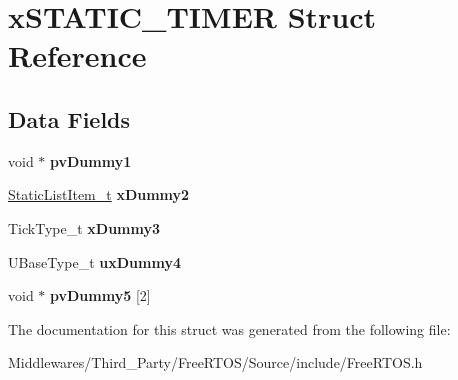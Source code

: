 \hypertarget{structx_s_t_a_t_i_c___t_i_m_e_r}{}\section{x\+S\+T\+A\+T\+I\+C\+\_\+\+T\+I\+M\+ER Struct Reference}
\label{structx_s_t_a_t_i_c___t_i_m_e_r}
\subsection*{Data Fields}
\begin{DoxyCompactItemize}
\item 
\mbox{\label{structx_s_t_a_t_i_c___t_i_m_e_r_a6d34686c479f85ca81b1c8b8d63de30f}} 
void $\ast$ {\bfseries pv\+Dummy1}
\item 
\mbox{\label{structx_s_t_a_t_i_c___t_i_m_e_r_af110422a11e634c23400ce5d10bd8b7f}} 
\mbox{\hyperlink{structx_s_t_a_t_i_c___l_i_s_t___i_t_e_m}{Static\+List\+Item\+\_\+t}} {\bfseries x\+Dummy2}
\item 
\mbox{\label{structx_s_t_a_t_i_c___t_i_m_e_r_ac1b972afc468f0e753a25442242e6137}} 
Tick\+Type\+\_\+t {\bfseries x\+Dummy3}
\item 
\mbox{\label{structx_s_t_a_t_i_c___t_i_m_e_r_a26be05b0990c51a2754226b559ab6550}} 
U\+Base\+Type\+\_\+t {\bfseries ux\+Dummy4}
\item 
\mbox{\label{structx_s_t_a_t_i_c___t_i_m_e_r_abae37cf280ed6295ec4169577ad19250}} 
void $\ast$ {\bfseries pv\+Dummy5} \mbox{[}2\mbox{]}
\end{DoxyCompactItemize}


The documentation for this struct was generated from the following file\+:\begin{DoxyCompactItemize}
\item 
Middlewares/\+Third\+\_\+\+Party/\+Free\+R\+T\+O\+S/\+Source/include/Free\+R\+T\+O\+S.\+h\end{DoxyCompactItemize}
